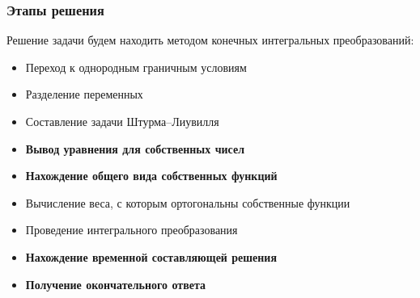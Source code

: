\documentclass[10pt,pdf,hyperref={unicode}]{beamer}
\begin{document}

\begin{frame}
  \frametitle{Этапы решения}
  Решение задачи будем находить методом конечных интегральных преобразований:
  \begin{itemize}
    \item Переход к однородным граничным условиям
    \item Разделение переменных
    \item Составление задачи Штурма--Лиувилля
    \item {\bf Вывод уравнения для собственных чисел}
    \item {\bf Нахождение общего вида собственных функций}
    \item Вычисление веса, с которым ортогональны собственные функции
    \item Проведение интегрального преобразования
    \item {\bf Нахождение временной составляющей решения}
    \item {\bf Получение окончательного ответа}
  \end{itemize}
\end{frame}
\end{document}
